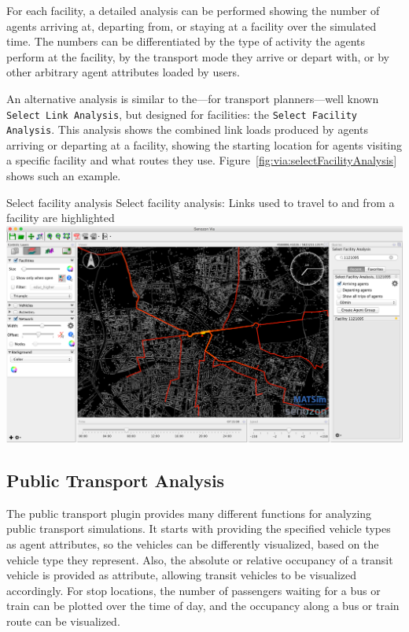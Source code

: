 For each facility, a detailed analysis can be performed showing the number of
agents arriving at, departing from, or staying at a \gls{facility} over the simulated
time. The numbers can be differentiated by the type of \gls{activity} the agents
perform at the facility, by the transport mode they arrive or depart with, or by
other arbitrary agent attributes loaded by users.

An alternative analysis is similar to the---for transport planners---well known
\lstinline|Select Link Analysis|, but designed for facilities: the \lstinline|Select Facility Analysis|. This
analysis shows the combined link loads produced by agents arriving or departing
at a facility, showing the starting location for agents visiting a specific \gls{facility} and
what routes they use. Figure~\ref{fig:via:selectFacilityAnalysis} shows
such an example.

\createfigure%
{Select facility analysis}%
{Select facility analysis: Links used to travel to and from a facility are highlighted}%
{\label{fig:via:selectFacilityAnalysis}}%
{\includegraphics[width=1.\textwidth,angle=0]{./extending/figures/via/selectFacilityAnalysis}}%
{}

\subsection{Public Transport Analysis}
The public transport plugin provides many different functions for analyzing
public transport simulations. It starts with providing the specified vehicle
types as agent attributes, so the vehicles can be differently visualized, based
on the vehicle type they represent. Also, the absolute or relative
occupancy of a transit vehicle is provided as attribute, allowing transit
vehicles to be visualized accordingly. For stop locations, the number of
passengers waiting for a bus or train can be plotted over the time of day, and
the occupancy along a bus or train route can be visualized.


